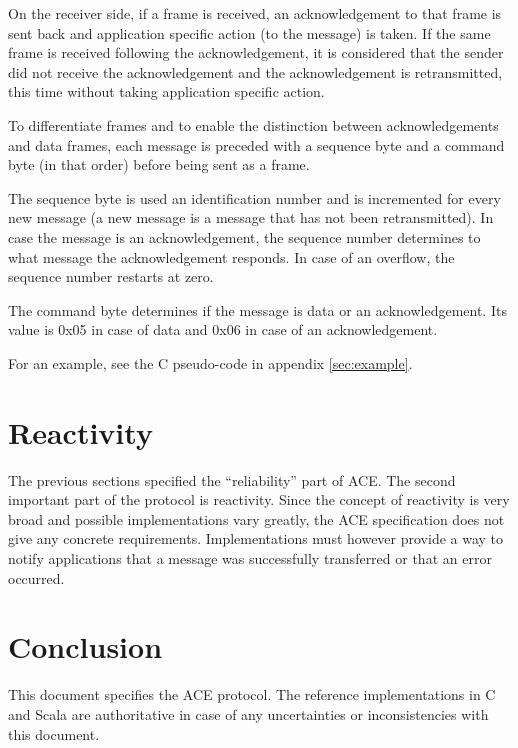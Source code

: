 \documentclass[10pt,a4paper]{article}
\begin{document}
On the receiver side, if a frame is received, an acknowledgement to that frame is sent back and application specific action (to the message) is taken. If the same frame is received following the acknowledgement, it is considered that the sender did not receive the acknowledgement and the acknowledgement is retransmitted, this time without taking application specific action.

To differentiate frames and to enable the distinction between acknowledgements and data frames, each message is preceded with a sequence byte and a command byte (in that order) before being sent as a frame.

The sequence byte is used an identification number and is incremented for every new message (a new message is a message that has not been retransmitted). In case the message is an acknowledgement, the sequence number determines to what message the acknowledgement responds. In case of an overflow, the sequence number restarts at zero.

The command byte determines if the message is data or an acknowledgement. Its value is 0x05 in case of data and 0x06 in case of an acknowledgement.

For an example, see the C pseudo-code in appendix \ref{sec:example}.

\section{Reactivity}
The previous sections specified the ``reliability'' part of ACE. The second important part of the protocol is reactivity. Since the concept of reactivity is very broad and possible implementations vary greatly, the ACE specification does not give any concrete requirements. Implementations must however provide a way to notify applications that a message was successfully transferred or that an error occurred.

\section{Conclusion}
This document specifies the ACE protocol. The reference implementations in C and Scala are authoritative in case of any uncertainties or inconsistencies with this document.

\newpage
\appendix
\end{document}
